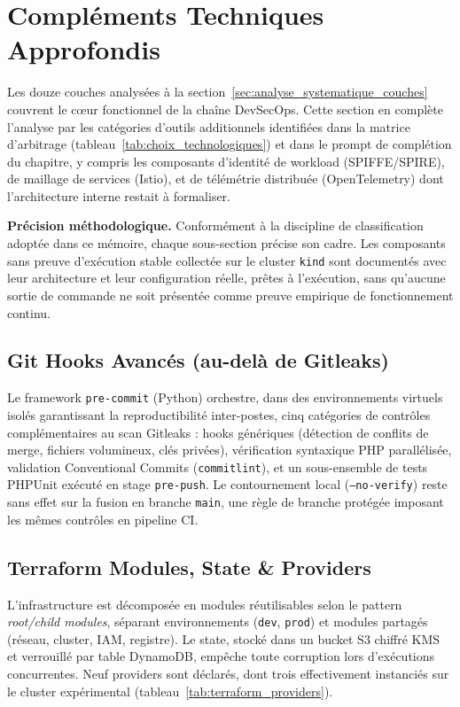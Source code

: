 \section{Compléments Techniques Approfondis}
\label{sec:complements_techniques}

Les douze couches analysées à la section~\ref{sec:analyse_systematique_couches} couvrent le cœur fonctionnel de la chaîne DevSecOps. Cette section en complète l'analyse par les catégories d'outils additionnels identifiées dans la matrice d'arbitrage (tableau~\ref{tab:choix_technologiques}) et dans le prompt de complétion du chapitre, y compris les composants d'identité de workload (SPIFFE/SPIRE), de maillage de services (Istio), et de télémétrie distribuée (OpenTelemetry) dont l'architecture interne restait à formaliser.

\textbf{Précision méthodologique.} Conformément à la discipline de classification adoptée dans ce mémoire, chaque sous-section précise son cadre. Les composants sans preuve d'exécution stable collectée sur le cluster \texttt{kind} sont documentés avec leur architecture et leur configuration réelle, prêtes à l'exécution, sans qu'aucune sortie de commande ne soit présentée comme preuve empirique de fonctionnement continu.

\subsection{Git Hooks Avancés (au-delà de Gitleaks)}
Le framework \texttt{pre-commit} (Python) orchestre, dans des environnements virtuels isolés garantissant la reproductibilité inter-postes, cinq catégories de contrôles complémentaires au scan Gitleaks : hooks génériques (détection de conflits de merge, fichiers volumineux, clés privées), vérification syntaxique PHP parallélisée, validation Conventional Commits (\texttt{commitlint}), et un sous-ensemble de tests PHPUnit exécuté en stage \texttt{pre-push}. Le contournement local (\texttt{--no-verify}) reste sans effet sur la fusion en branche \texttt{main}, une règle de branche protégée imposant les mêmes contrôles en pipeline CI.

\subsection{Terraform Modules, State \& Providers}
L'infrastructure est décomposée en modules réutilisables selon le pattern \textit{root/child modules}, séparant environnements (\texttt{dev}, \texttt{prod}) et modules partagés (réseau, cluster, IAM, registre). Le state, stocké dans un bucket S3 chiffré KMS et verrouillé par table DynamoDB, empêche toute corruption lors d'exécutions concurrentes. Neuf providers sont déclarés, dont trois effectivement instanciés sur le cluster expérimental (tableau~\ref{tab:terraform_providers}).

